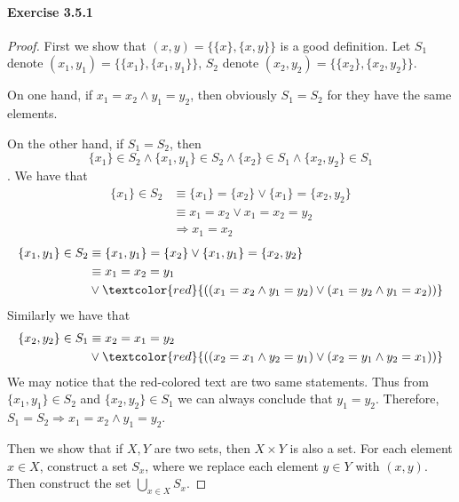 \paragraph{Exercise 3.5.1} \label{exercise3.5.1}
\begin{proof}
First we show that $(x,y) = \{\{x\},\{x,y\}\}$ is a good definition. 
Let $S_1$ denote $(x_1,y_1) = \{\{x_1\},\{x_1,y_1\}\}$, $S_2$ denote 
$(x_2,y_2) = \{\{x_2\},\{x_2,y_2\}\}$.

On one hand, if $x_1=x_2\wedge y_1=y_2$, then obviously $S_1=S_2$ for they have the same elements.

On the other hand, if $S_1 = S_2$, then 
\[
\{x_1\} \in S_2 \wedge \{x_1,y_1\} \in S_2 \wedge
\{x_2\} \in S_1 \wedge \{x_2,y_2\} \in S_1 
\].
We have that 
\begin{align*}
\{x_1\} \in S_2 &\equiv \{x_1\} = \{x_2\} \vee \{x_1\} = \{x_2,y_2\} \\
&\equiv x_1=x_2 \vee x_1=x_2=y_2 \\
&\Longrightarrow x_1=x_2
\end{align*}
\begin{align*}
\{x_1,y_1\} \in S_2 &\equiv \{x_1,y_1\} = \{x_2\} \vee \{x_1,y_1\} = \{x_2,y_2\} \\
&\equiv x_1=x_2=y_1 \\
&\vee \textcolor{red}{((x_1=x_2\wedge y_1=y_2)\vee(x_1=y_2\wedge y_1=x_2))} 
\end{align*}
Similarly we have that
\begin{align*}
\{x_2,y_2\} \in S_1 
&\equiv x_2=x_1=y_2 \\
&\vee \textcolor{red}{((x_2=x_1\wedge y_2=y_1)\vee(x_2=y_1\wedge y_2=x_1))}
\end{align*}
We may notice that the red-colored text are two same statements. Thus from $\{x_1,y_1\} \in S_2$ and 
$\{x_2,y_2\} \in S_1$ we can always conclude that $y_1=y_2$. Therefore, 
$S_1 = S_2 \Longrightarrow x_1=x_2\wedge y_1=y_2$.

Then we show that if $X,Y$ are two sets, then $X \times Y$ is also a set. For each element $x \in X$, 
construct a set $S_x$, where we replace each element $y \in Y$ with $(x,y)$. Then construct the set 
$\bigcup_{x \in X}S_x$.
\end{proof}

